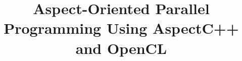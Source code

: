 \documentclass{sig-alternate-05-2015}
\begin{document}






%

\title{Aspect-Oriented Parallel Programming Using AspectC++ and OpenCL}
%
%
%
%
%
\end{document}
